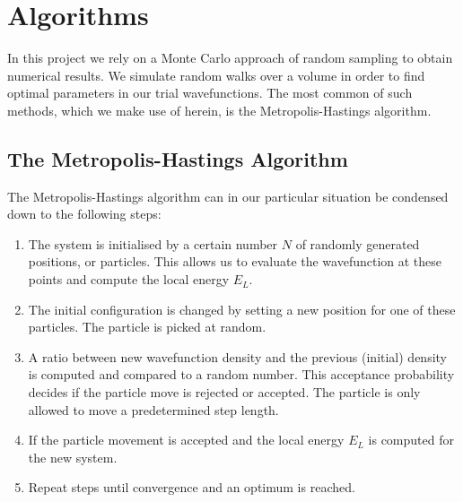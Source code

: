 \documentclass[
    a4paper, aps, twocolumn, floatfix, superscriptaddress,
    nofootinbib]{revtex4-1}
\newcommand{\1}{\mathds{1}}
\begin{document}
\section{Algorithms}
    In this project we rely on a Monte Carlo approach of random sampling to
    obtain numerical results.  We simulate random walks over a volume in order
    to find optimal parameters in our trial wavefunctions.  The most common of
    such methods, which we make use of herein, is the Metropolis-Hastings
    algorithm.

    \subsection{The Metropolis-Hastings Algorithm}
        The Metropolis-Hastings algorithm can in our particular situation be
        condensed down to the following steps:

        \begin{enumerate}
            \item The system is initialised by a certain number $N$ of randomly
                generated positions, or particles. This allows us to evaluate
                the wavefunction at these points and compute the local energy
                $E_L$.

            \item The initial configuration is changed by setting a new position
                for one of these particles. The particle is picked at random.

            \item A ratio between new wavefunction density and the previous
                (initial) density is computed and compared to a random number.
                This acceptance probability decides if the particle move is
                rejected or accepted.  The particle is only allowed to move a
                predetermined step length.

            \item If the particle movement is accepted and the local energy
                $E_L$ is computed for the new system.

            \item Repeat steps until convergence and an optimum is reached.

        \end{enumerate}
\end{document}

